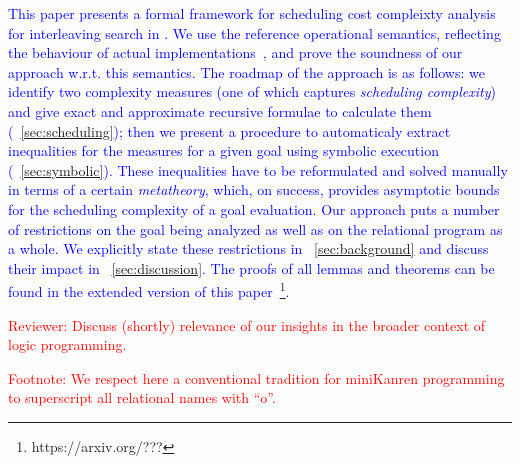 \textcolor{blue}{
This paper presents a formal framework for scheduling cost compleixty analysis for interleaving search in \mK.
We use the reference operational semantics, reflecting the behaviour of actual implementations~\cite{CertifiedSemantics}, and prove the soundness of our approach w.r.t. this semantics.
The roadmap of the approach is as follows: we identify two complexity measures (one of which captures \emph{scheduling complexity}) and give exact and approximate recursive formulae to calculate them (\sectionword~\ref{sec:scheduling}); then we present a procedure to automaticaly extract inequalities for the measures for a given goal using symbolic execution (\sectionword~\ref{sec:symbolic}). 
These inequalities have to be reformulated and solved manually in terms of a certain \emph{metatheory}, which, on success, provides asymptotic bounds for the scheduling complexity of a goal evaluation.
Our approach puts a number of restrictions on the goal being analyzed as well as on the relational program as a whole.
We explicitly state these restrictions in \sectionword~\ref{sec:background} and discuss their impact in \sectionword~\ref{sec:discussion}.
The proofs of all lemmas and theorems can be found in the extended version of this paper~\footnote{https://arxiv.org/???}.}

\textcolor{red}{Reviewer: Discuss (shortly) relevance of our insights in the broader context of logic programming.}

\textcolor{red}{Footnote: We respect here a conventional tradition for miniKanren programming to superscript all relational names with ``o''.}
